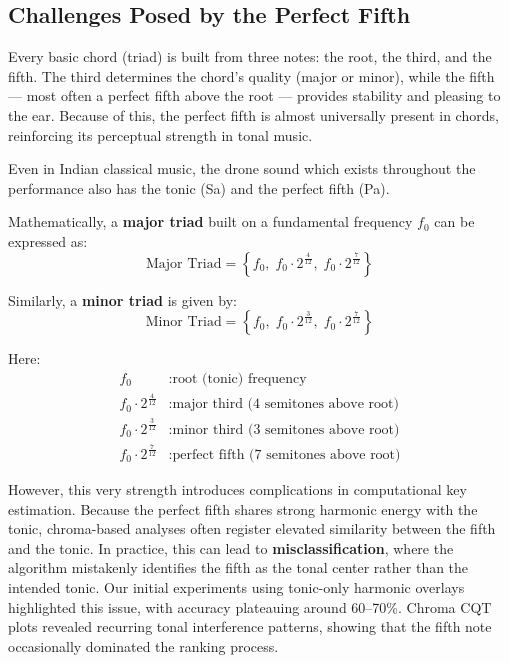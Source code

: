 \documentclass[10pt,twocolumn]{article}
\begin{document}
\subsection{Challenges Posed by the Perfect Fifth}\label{sec:challenges-posed-by-the-perfect-fifth}

Every basic chord (triad) is built from three notes: the root, the third, and the fifth.
The third determines the chord’s quality (major or minor), while the fifth --- most often a perfect fifth above the root --- provides stability and pleasing to the ear.
Because of this, the perfect fifth is almost universally present in chords, reinforcing its perceptual strength in tonal music.

Even in Indian classical music, the drone sound which exists throughout the performance also has the tonic (Sa) and the perfect fifth (Pa).

Mathematically, a \textbf{major triad} built on a fundamental frequency $f_0$ can be expressed as:
\begin{equation}
\text{Major Triad} = \left\{ f_0,\; f_0 \cdot 2^{\tfrac{4}{12}},\; f_0 \cdot 2^{\tfrac{7}{12}} \right\} \label{eq:major_triad}
\end{equation}

Similarly, a \textbf{minor triad} is given by:
\begin{equation}
\text{Minor Triad} = \left\{ f_0,\; f_0 \cdot 2^{\tfrac{3}{12}},\; f_0 \cdot 2^{\tfrac{7}{12}} \right\} \label{eq:minor_triad}
\end{equation}

Here:
\begin{align*}
f_0 & : \text{root (tonic) frequency} \\
f_0 \cdot 2^{\tfrac{4}{12}} & : \text{major third (4 semitones above root)} \\
f_0 \cdot 2^{\tfrac{3}{12}} & : \text{minor third (3 semitones above root)} \\
f_0 \cdot 2^{\tfrac{7}{12}} & : \text{perfect fifth (7 semitones above root)}
\end{align*}

However, this very strength introduces complications in computational key estimation.
Because the perfect fifth shares strong harmonic energy with the tonic, chroma-based analyses often register elevated similarity between the fifth and the tonic.
In practice, this can lead to \textbf{misclassification}, where the algorithm mistakenly identifies the fifth as the tonal center rather than the intended tonic.
Our initial experiments using tonic-only harmonic overlays highlighted this issue, with accuracy plateauing around 60--70\%.
Chroma CQT plots revealed recurring tonal interference patterns, showing that the fifth note occasionally dominated the ranking process.
\end{document}
